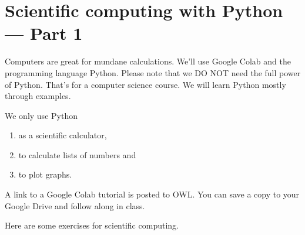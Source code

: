 \documentclass[../main.tex]{subfiles}
\begin{document}
 \section{Scientific computing with Python --- Part 1}

Computers are great for mundane calculations. We'll use Google Colab and the programming language Python. Please note that we DO NOT need the full power of Python. That's for a computer science course.  We will learn Python mostly through examples. 

We only use Python 
\begin{enumerate}
  \item as a scientific calculator,
  \item to calculate lists of numbers and
  \item to plot graphs.
\end{enumerate}

A link to a Google Colab tutorial is posted to OWL. You can save a copy to your Google Drive and follow along in class.

Here are some exercises for scientific computing.
\end{document}
